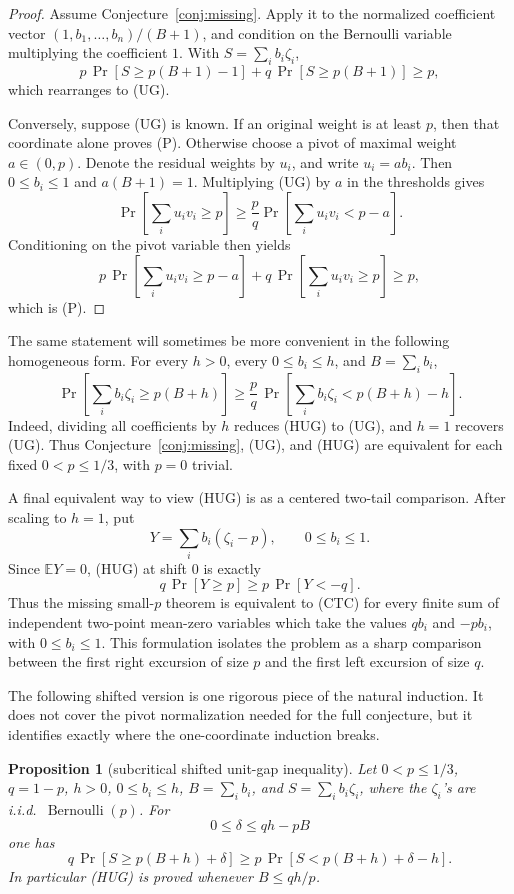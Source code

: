 \documentclass[12pt]{article}
\newtheorem{proposition}{Proposition}
\newcommand{\Ber}{\operatorname{Bernoulli}}
\begin{document}
\begin{proof}
Assume Conjecture~\ref{conj:missing}.  Apply it to the normalized coefficient vector
\((1,b_1,\ldots,b_n)/(B+1)\), and condition on the
Bernoulli variable multiplying the coefficient \(1\).  With
\(S=\sum_i b_i\zeta_i\),
\[
 p\,\Pr[S\ge p(B+1)-1]+q\,\Pr[S\ge p(B+1)]\ge p,
\]
which rearranges to (UG).

Conversely, suppose (UG) is known.  If an original weight is at least \(p\),
then that coordinate alone proves (P).  Otherwise choose a pivot of maximal
weight \(a\in(0,p)\).  Denote the residual weights by \(u_i\), and write
\(u_i=a b_i\).  Then \(0\le b_i\le1\) and \(a(B+1)=1\).  Multiplying (UG) by \(a\) in the thresholds
gives
\[
 \Pr\!\left[\sum_i u_i v_i\ge p\right]
 \ge \frac pq
 \Pr\!\left[\sum_i u_i v_i<p-a\right].
\]
Conditioning on the pivot variable then yields
\[
 p\,\Pr\!\left[\sum_i u_i v_i\ge p-a\right]
 +q\,\Pr\!\left[\sum_i u_i v_i\ge p\right]\ge p,
\]
which is (P).
\end{proof}

The same statement will sometimes be more convenient in the following
homogeneous form.  For every \(h>0\), every \(0\le b_i\le h\), and
\(B=\sum_i b_i\),
\[
 \Pr\!\left[\sum_i b_i\zeta_i\ge p(B+h)\right]
 \ge
 \frac{p}{q}\,
 \Pr\!\left[\sum_i b_i\zeta_i<p(B+h)-h\right].            \tag{HUG}
\]
Indeed, dividing all coefficients by \(h\) reduces (HUG) to (UG), and \(h=1\)
recovers (UG).  Thus Conjecture~\ref{conj:missing}, (UG), and (HUG) are
equivalent for each fixed \(0<p\le1/3\), with \(p=0\) trivial.

A final equivalent way to view (HUG) is as a centered two-tail comparison.
After scaling to \(h=1\), put
\[
        Y=\sum_i b_i(\zeta_i-p),\qquad 0\le b_i\le1 .
\]
Since \(\mathbb E Y=0\), (HUG) at shift \(0\) is exactly
\[
        q\,\Pr[Y\ge p]\ge p\,\Pr[Y<-q].                  \tag{CTC}
\]
Thus the missing small-\(p\) theorem is equivalent to (CTC) for every finite
sum of independent two-point mean-zero variables which take the values
\(q b_i\) and \(-p b_i\), with \(0\le b_i\le1\).  This formulation isolates
the problem as a sharp comparison between the first right excursion of size
\(p\) and the first left excursion of size \(q\).

The following shifted version is one rigorous piece of the natural induction.
It does not cover the pivot normalization needed for the full conjecture, but it
identifies exactly where the one-coordinate induction breaks.

\begin{proposition}[subcritical shifted unit-gap inequality]\label{prop:subcritical}
Let \(0<p\le1/3\), \(q=1-p\), \(h>0\), \(0\le b_i\le h\), \(B=\sum_i b_i\),
and \(S=\sum_i b_i\zeta_i\), where the \(\zeta_i\)'s are i.i.d.\ \(\Ber(p)\).
For
\[
        0\le \delta\le qh-pB
\]
one has
\[
 q\,\Pr\!\left[S\ge p(B+h)+\delta\right]
 \ge
 p\,\Pr\!\left[S<p(B+h)+\delta-h\right].                 \tag{6}
\]
In particular (HUG) is proved whenever \(B\le qh/p\).
\end{proposition}
\end{document}
